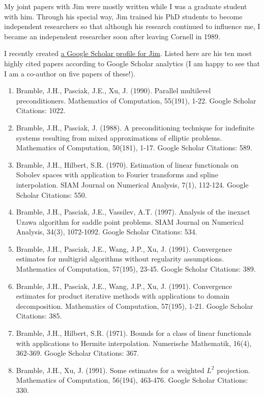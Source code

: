 \documentclass[CJK,11pt]{amsart}
\theoremstyle{definition}
\begin{document}
\begin{CJK*}{UTF8}{gbsn}
My joint papers with Jim were mostly written while I was a graduate student with him. Through his special way, Jim trained his PhD students to become independent researchers so that although his research continued to influence me, I became an independent researcher soon after leaving Cornell in 1989. %

I recently created \href{https://scholar.google.com/citations?user=RuZVUoAAAAAJ\&hl=en\&oi=ao}{a Google Scholar profile for Jim}.
Listed here are his ten most highly cited papers according to Google Scholar analytics (I am happy to see that I am a co-author on five papers of these!). 
\begin{enumerate}
\item Bramble, J.H., Pasciak, J.E., Xu, J. (1990). Parallel multilevel preconditioners. Mathematics of Computation, 55(191), 1-22. Google Scholar Citations: 1022. 
\item Bramble, J.H., Pasciak, J. (1988). A preconditioning technique for indefinite systems resulting from mixed approximations of elliptic problems. Mathematics of Computation, 50(181), 1-17. Google Scholar Citations: 589.
\item Bramble, J.H., Hilbert, S.R. (1970). Estimation of linear functionals on Sobolev spaces with application to Fourier transforms and spline interpolation. SIAM Journal on Numerical Analysis, 7(1), 112-124. Google Scholar Citations: 550.
\item Bramble, J.H., Pasciak, J.E., Vassilev, A.T. (1997). Analysis of the inexact Uzawa algorithm for saddle point problems. SIAM Journal on Numerical Analysis, 34(3), 1072-1092. Google Scholar Citations: 534.
\item Bramble, J.H., Pasciak, J.E., Wang, J.P.,  Xu, J. (1991). Convergence estimates for multigrid algorithms without regularity assumptions. Mathematics of Computation, 57(195), 23-45. Google Scholar Citations: 389.
\item Bramble, J.H., Pasciak, J.E., Wang, J.P., Xu, J. (1991). Convergence estimates for product iterative methods with applications to domain decomposition. Mathematics of Computation, 57(195), 1-21. Google Scholar Citations: 385.
\item Bramble, J.H., Hilbert, S.R. (1971). Bounds for a class of linear functionals with applications to Hermite interpolation. Numerische Mathematik, 16(4), 362-369. Google Scholar Citations: 367.
\item Bramble, J.H., Xu, J. (1991). Some estimates for a weighted $L^2$ projection. Mathematics of Computation, 56(194), 463-476. Google Scholar Citations: 330.

\end{enumerate}
\end{CJK*}
\end{document}
